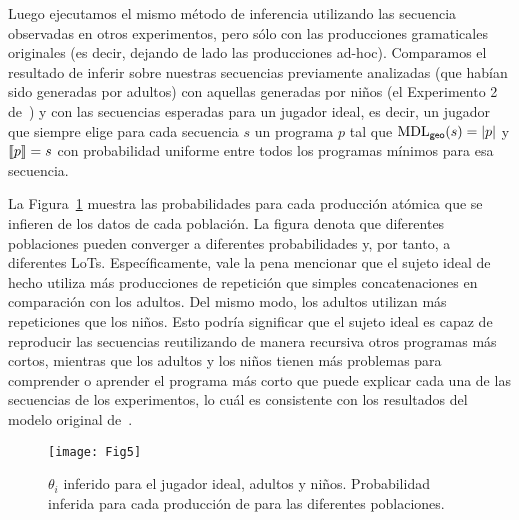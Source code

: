 Luego ejecutamos el mismo método de inferencia utilizando las secuencia observadas en otros experimentos, pero sólo con las producciones gramaticales originales (es decir, dejando de lado las producciones ad-hoc). Comparamos el resultado de inferir sobre nuestras secuencias previamente analizadas (que habían sido generadas por adultos) con aquellas generadas por niños (el Experimento 2 de~\cite{amalric2017language}) y con las secuencias esperadas para un jugador ideal, es decir, un jugador que siempre elige para cada secuencia $s$ un programa $p$ tal que ${\rm MDL}_{{\sf geo}}(s) = |p|$ y $\llbracket p\rrbracket=s$ con probabilidad uniforme entre todos los programas mínimos para esa secuencia.


La Figura~\ref{fig:adultVsChildren} muestra las probabilidades para cada producción atómica que se infieren de los datos de cada población. La figura denota que diferentes poblaciones pueden converger a diferentes probabilidades y, por tanto, a diferentes LoTs. Específicamente, vale la pena mencionar que el sujeto ideal de hecho utiliza más producciones de repetición que simples concatenaciones en comparación con los adultos. Del mismo modo, los adultos utilizan más repeticiones que los niños. Esto podría significar que el sujeto ideal es capaz de reproducir las secuencias reutilizando de manera recursiva otros programas más cortos, mientras que los adultos y los niños tienen más problemas para comprender o aprender el programa más corto que puede explicar cada una de las secuencias de los experimentos, lo cuál es consistente con los resultados del modelo original de~\cite{amalric2017language}.

\begin{figure}[!ht]
    \centering
    \texttt{[image: Fig5]}
    \caption{$\theta_i$ inferido para el jugador ideal, adultos y niños. Probabilidad inferida para cada producción de \gramgeo para las diferentes poblaciones.}
    \label{fig:adultVsChildren}
\end{figure}


